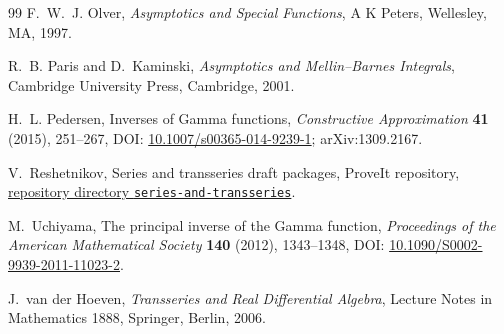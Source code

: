 \documentclass[11pt,a4paper]{article}
\numberwithin{equation}{section}
\theoremstyle{definition}
\theoremstyle{remark}
\begin{document}
\begin{thebibliography}{99}
F.~W.~J. Olver,
\newblock \emph{Asymptotics and Special Functions},
\newblock A K Peters, Wellesley, MA, 1997.

R.~B. Paris and D.~Kaminski,
\newblock \emph{Asymptotics and Mellin--Barnes Integrals},
\newblock Cambridge University Press, Cambridge, 2001.

H.~L. Pedersen,
\newblock Inverses of Gamma functions,
\newblock \emph{Constructive Approximation} \textbf{41} (2015), 251--267,
\newblock DOI: \href{https://doi.org/10.1007/s00365-014-9239-1}
{10.1007/s00365-014-9239-1}; arXiv:1309.2167.

V.~Reshetnikov,
\newblock Series and transseries draft packages,
\newblock ProveIt repository,
\newblock \href{https://github.com/VladimirReshetnikov/ProveIt/tree/main/Analysis/FabiusFunction/docs/semi-formalized-research-frontiers/drafts/series-and-transseries}
{repository directory \texttt{series-and-transseries}}.

M.~Uchiyama,
\newblock The principal inverse of the Gamma function,
\newblock \emph{Proceedings of the American Mathematical Society}
\textbf{140} (2012), 1343--1348,
\newblock DOI: \href{https://doi.org/10.1090/S0002-9939-2011-11023-2}
{10.1090/S0002-9939-2011-11023-2}.

J.~van der Hoeven,
\newblock \emph{Transseries and Real Differential Algebra},
\newblock Lecture Notes in Mathematics 1888, Springer, Berlin, 2006.

\end{thebibliography}
\end{document}
